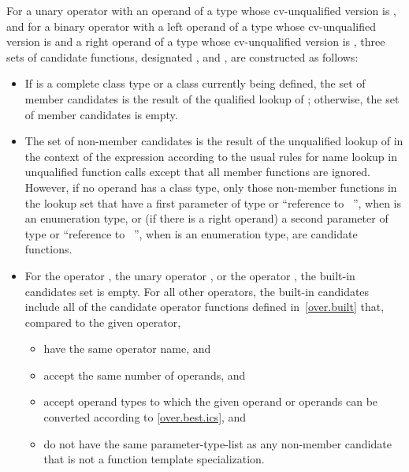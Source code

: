 \pnum
For a unary operator
with an operand of a type whose cv-unqualified version is
,
and for a binary operator
with a left operand of a type whose cv-unqualified version is
and a right operand of a type whose cv-unqualified version is
,
three sets of candidate functions, designated
,
and ,
are constructed as follows:
\begin{itemize}
\item
If
is a complete class type or a class currently being defined, the set of member candidates is the
result of the qualified lookup of
; otherwise, the set of member
candidates is empty.
\item
The set of non-member candidates is the result of the unqualified lookup of
in the context of
the expression according to the usual rules for name
lookup in unqualified function calls except
that all member functions are ignored.
However, if no operand has a class type, only those non-member
functions in the lookup set that have a first parameter of type
or ``reference to \cv{}~'',
when
is an enumeration type,
or (if there is a right operand) a second parameter of type
or ``reference to \cv{}~'',
when
is an enumeration type,
are candidate functions.
\item
For the operator
\tcode{,},
the unary operator
\tcode{\&},
or the operator
\tcode{->},
the built-in candidates set is empty.
For all other operators, the built-in candidates include all
of the candidate operator functions defined in~\ref{over.built} that,
compared to the given operator,

\begin{itemize}
\item
have the same operator name, and
\item
accept the same number of operands, and
\item
accept operand types to which the given operand or
operands can be converted according to \ref{over.best.ics}, and
\item
do not have the same parameter-type-list as any non-member candidate
that is not a function template specialization.
\end{itemize}
\end{itemize}


